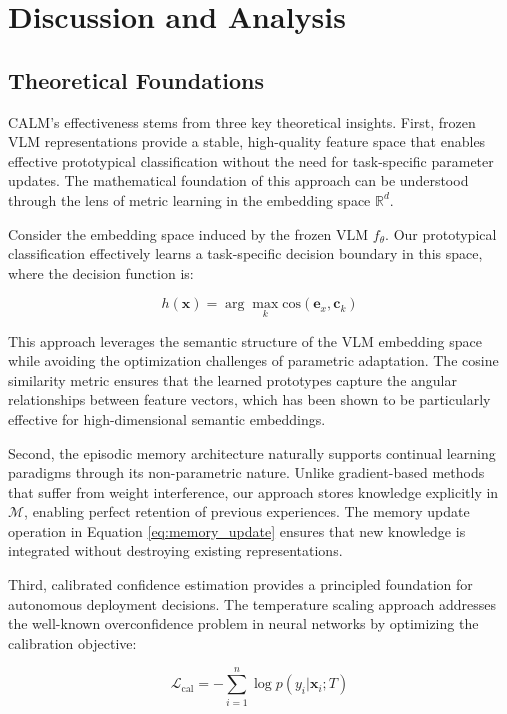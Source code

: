 \documentclass[conference]{IEEEtran}
\begin{document}
\section{Discussion and Analysis}

\subsection{Theoretical Foundations}

CALM's effectiveness stems from three key theoretical insights. First, frozen VLM representations provide a stable, high-quality feature space that enables effective prototypical classification without the need for task-specific parameter updates. The mathematical foundation of this approach can be understood through the lens of metric learning in the embedding space $\mathbb{R}^d$.

Consider the embedding space induced by the frozen VLM $f_\theta$. Our prototypical classification effectively learns a task-specific decision boundary in this space, where the decision function is:

\begin{equation}
h(\mathbf{x}) = \arg\max_k \text{cos}(\mathbf{e}_x, \mathbf{c}_k)
\end{equation}

This approach leverages the semantic structure of the VLM embedding space while avoiding the optimization challenges of parametric adaptation. The cosine similarity metric ensures that the learned prototypes capture the angular relationships between feature vectors, which has been shown to be particularly effective for high-dimensional semantic embeddings.

Second, the episodic memory architecture naturally supports continual learning paradigms through its non-parametric nature. Unlike gradient-based methods that suffer from weight interference, our approach stores knowledge explicitly in $\mathcal{M}$, enabling perfect retention of previous experiences. The memory update operation in Equation \eqref{eq:memory_update} ensures that new knowledge is integrated without destroying existing representations.

Third, calibrated confidence estimation provides a principled foundation for autonomous deployment decisions. The temperature scaling approach addresses the well-known overconfidence problem in neural networks by optimizing the calibration objective:

\begin{equation}
\mathcal{L}_{\text{cal}} = -\sum_{i=1}^{n} \log p(y_i | \mathbf{x}_i; T)
\end{equation}
\end{document}

